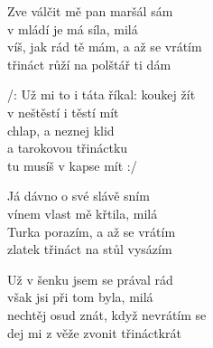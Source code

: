 
\ve{}
Zve válčit mě pan maršál sám\\
v mládí je má síla, milá\\
víš, jak rád tě mám, a až se vrátím\\
třináct růží na polštář ti dám

\cho{}
/: Už mi to i táta říkal: koukej žít\\
v neštěstí i těstí mít\\
chlap, a neznej klid\\
a tarokovou třináctku\\
tu musíš v kapse mít :/

\ve{}
Já dávno o své slávě sním\\
vínem vlast mě křtila, milá\\
Turka porazím, a až se vrátím\\
zlatek třináct na stůl vysázím

\cho{}

\ve{}
Už v šenku jsem se prával rád\\
však jsi při tom byla, milá\\
nechtěj osud znát, když nevrátím se\\
dej mi z věže zvonit třináctkrát

\cho{}

\esong{}
